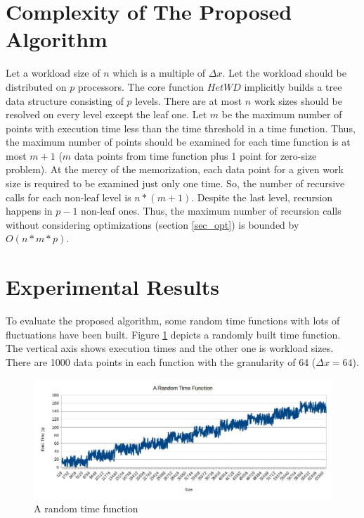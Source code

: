 \documentclass[12pt]{article}
\begin{document}
\section{Complexity of The Proposed Algorithm}	\label{sec_timeComp}
Let a workload size of $n$ which is a multiple of $\Delta x$. Let the workload should be distributed on $p$ processors. The core function $HetWD$ implicitly builds a tree data structure consisting of $p$ levels. There are at most $n$ work sizes should be resolved on every level except the leaf one. Let $m$ be the maximum number of points with execution time less than the time threshold in a time function. Thus, the maximum number of points should be examined for each time function is at most $m + 1$ ($m$ data points from time function plus 1 point for zero-size problem). At the mercy of the memorization, each data point for a given work size is required to be examined just only one time. So, the number of recursive calls for each non-leaf level is $n * (m + 1)$. Despite the last level, recursion happens in $p - 1$ non-leaf ones. Thus, the maximum number of recursion calls without considering optimizations (section \ref{sec_opt}) is bounded by $O(n * m * p)$. 
	
\section{Experimental Results}
To evaluate the proposed algorithm, some random time functions with lots of fluctuations have been built. Figure \ref{fig:randomTimeFunction} depicts a randomly built time function. The vertical axis shows execution times and the other one is workload sizes. There are 1000 data points in each function with the granularity of 64 ($\Delta x = 64$).

\begin{figure}[!t]
\centering
\includegraphics[width=6in]{Images/randonTimeFunction.jpg}
\caption{A random time function}
\label{fig:randomTimeFunction}
\end{figure}
\end{document}
